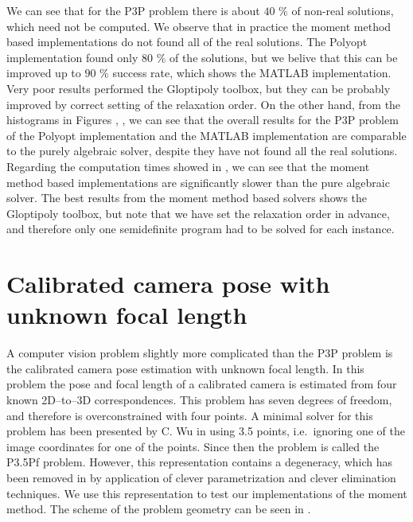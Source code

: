 We can see that for the P3P problem there is about $40$ \% of non-real solutions, which need not be computed.
We observe that in practice the moment method based implementations do not found all of the real solutions.
The Polyopt implementation found only $80$ \% of the solutions, but we belive that this can be improved up to $90$ \% success rate, which shows the MATLAB implementation.
Very poor results performed the Gloptipoly toolbox, but they can be probably improved by correct setting of the relaxation order.
On the other hand, from the histograms in Figures , ,  we can see that the overall results for the P3P problem of the Polyopt implementation and the MATLAB implementation are comparable to the purely algebraic solver, despite they have not found all the real solutions.
Regarding the computation times showed in , we can see that the moment method based implementations are significantly slower than the  pure algebraic solver.
The best results from the moment method based solvers shows the Gloptipoly \cite{gloptipoly} toolbox, but note that we have set the relaxation order in advance, and therefore only one semidefinite program had to be solved for each instance.

\section{Calibrated camera pose with unknown focal length}

A computer vision problem slightly more complicated than the P3P problem is the calibrated camera pose estimation with unknown focal length.
In this problem the pose and focal length of a calibrated camera is estimated from four known 2D--to--3D correspondences.
This problem has seven degrees of freedom, and therefore is overconstrained with four points.
A minimal solver for this problem has been presented by C. Wu in \cite{P35PfWu} using 3.5 points, i.e.\ ignoring one of the image coordinates for one of the points.
Since then the problem is called the P3.5Pf problem.
However, this representation contains a degeneracy, which has been removed in \cite{P35Pf} by application of clever parametrization and clever elimination techniques.
We use this representation to test our implementations of the moment method.
The scheme of the problem geometry can be seen in .


